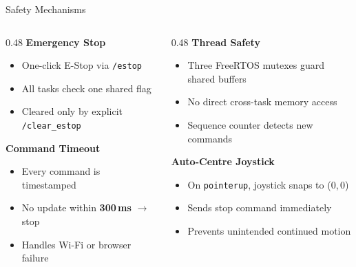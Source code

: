 \documentclass[aspectratio=169, 11pt]{beamer}
\begin{document}
\begin{frame}{Safety Mechanisms}

  \begin{columns}[T]
    \begin{column}{0.48\textwidth}
      \textbf{\color{danger}Emergency Stop}
      \begin{itemize}
        \item One-click E-Stop via \texttt{/estop}
        \item All tasks check one shared flag
        \item Cleared only by explicit \texttt{/clear\_estop}
      \end{itemize}

      \bigskip
      \textbf{\color{comm}Command Timeout}
      \begin{itemize}
        \item Every command is timestamped
        \item No update within \textbf{300\,ms} $\rightarrow$ stop
        \item Handles Wi-Fi or browser failure
      \end{itemize}
    \end{column}

    \begin{column}{0.48\textwidth}
      \textbf{\color{ctrl}Thread Safety}
      \begin{itemize}
        \item Three FreeRTOS mutexes guard shared buffers
        \item No direct cross-task memory access
        \item Sequence counter detects new commands
      \end{itemize}

      \bigskip
      \textbf{\color{sw}Auto-Centre Joystick}
      \begin{itemize}
        \item On \texttt{pointerup}, joystick snaps to (0,\,0)
        \item Sends stop command immediately
        \item Prevents unintended continued motion
      \end{itemize}
    \end{column}
  \end{columns}
\end{frame}
\end{document}

